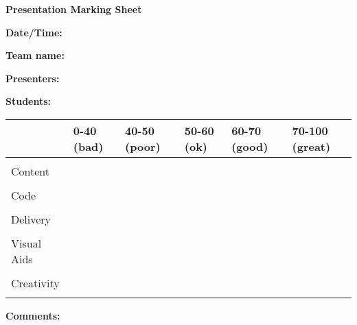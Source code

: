 \documentclass{article}
\begin{document}
\begin{center}
{\huge\textbf{Presentation Marking Sheet}}\\
\end{center}
\vspace{1cm}
\textbf{Date/Time:}\\
\vspace{1cm}

\textbf{Team name:}\\
\vspace{1cm}

\textbf{Presenters:}\\
\vspace{1cm}

\textbf{Students:}\\
\vspace{1cm}

\begin{center}
\begin{tabular}{l|p{1cm}p{1cm}p{1cm}p{1cm}p{1cm}}
\toprule
&0-40 (bad)&40-50 (poor) &50-60 (ok) &60-70 (good) &70-100 (great)\\
\midrule
&&&&&\\
Content&&&&&\\
&&&&&\\
Code&&&&&\\
&&&&&\\
Delivery&&&&&\\
&&&&&\\
Visual Aids&&&&&\\
&&&&&\\
Creativity&&&&&\\
&&&&&\\
\bottomrule
\end{tabular}
\end{center}

\vspace{1cm}
\textbf{Comments:}

\end{document}
